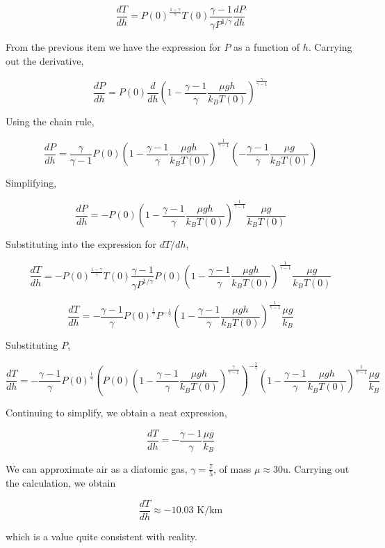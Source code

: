 \documentclass[11pt]{article}
\begin{document}
\begin{pproblem}
\begin{pssolution*}{}{}
\begin{alternativas}
        \[\frac{dT}{dh} = P(0)^\frac{1-\gamma}{\gamma}T(0) \frac{\gamma-1}{\gamma P^{1/\gamma}}\frac{dP}{dh}\]

        From the previous item we have the expression for \(P\) as a function of \(h\). Carrying out the derivative,

        \[\frac{dP}{dh} = P(0)\frac{d}{dh}\left(1-\frac{\gamma-1}{\gamma}\frac{\mu g h}{k_B T(0)}\right)^{\frac{\gamma}{\gamma-1}}\]

        Using the chain rule,

        \[\frac{dP}{dh} = \frac{\gamma}{\gamma-1}P(0)\left(1-\frac{\gamma-1}{\gamma}\frac{\mu g h}{k_B T(0)}\right)^{\frac{1}{\gamma-1}}\left(-\frac{\gamma-1}{\gamma}\frac{\mu g}{k_B T(0)}\right)\]

        Simplifying,

        \[\frac{dP}{dh} = -P(0)\left(1-\frac{\gamma-1}{\gamma}\frac{\mu g h}{k_B T(0)}\right)^{\frac{1}{\gamma-1}}\frac{\mu g}{k_B T(0)}\]

        Substituting into the expression for \(dT/dh\),

        \[\frac{dT}{dh} = -P(0)^\frac{1-\gamma}{\gamma}T(0) \frac{\gamma-1}{\gamma P^{1/\gamma}}P(0)\left(1-\frac{\gamma-1}{\gamma}\frac{\mu g h}{k_B T(0)}\right)^{\frac{1}{\gamma-1}}\frac{\mu g}{k_B T(0)}\]

        \[\frac{dT}{dh} = -\frac{\gamma-1}{\gamma}P(0)^\frac{1}{\gamma} P^{-\frac{1}{\gamma}}\left(1-\frac{\gamma-1}{\gamma}\frac{\mu g h}{k_B T(0)}\right)^{\frac{1}{\gamma-1}}\frac{\mu g}{k_B}\]

        Substituting \(P\),

        \[\frac{dT}{dh} = -\frac{\gamma-1}{\gamma}P(0)^\frac{1}{\gamma} \left(P(0)\left(1-\frac{\gamma-1}{\gamma}\frac{\mu g h}{k_B T(0)}\right)^{\frac{\gamma}{\gamma-1}}\right)^{-\frac{1}{\gamma}}\left(1-\frac{\gamma-1}{\gamma}\frac{\mu g h}{k_B T(0)}\right)^{\frac{1}{\gamma-1}}\frac{\mu g}{k_B}\]

        Continuing to simplify, we obtain a neat expression,

        \[\frac{dT}{dh} = -\frac{\gamma-1}{\gamma}\frac{\mu g}{k_B}\]

        We can approximate air as a diatomic gas, \(\gamma = \frac{7}{5}\), of mass \(\mu\approx 30\)u. Carrying out the calculation, we obtain

        \[\boxed{\frac{dT}{dh} \approx - 10.03 \text{ K/km}}\]

        which is a value quite consistent with reality.
    \end{alternativas}
\end{pssolution*}
\end{pproblem}
\end{document}
